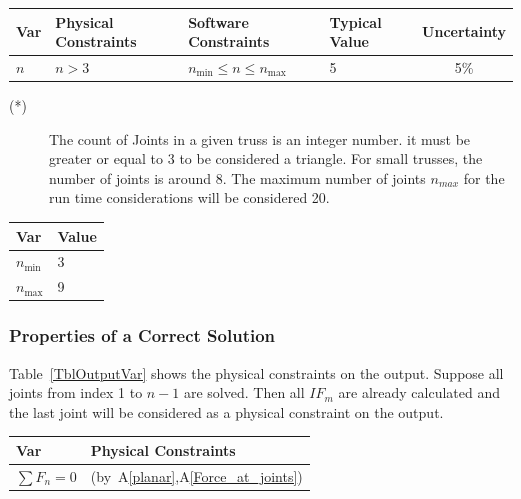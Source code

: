 \documentclass[12pt]{article}
\newcommand{\aref}[1]{A\ref{#1}}
\begin{document}
\begin{table}[!h]
  \caption{Input Variables} \label{TblInputVar}
  \renewcommand{\arraystretch}{1.2}
\noindent \begin{longtable*}{l l l l c} 
  \toprule
  \textbf{Var} & \textbf{Physical Constraints} & \textbf{Software Constraints} &
                             \textbf{Typical Value} & \textbf{Uncertainty}\\
  \midrule 
  $n$ & $n > 3$ & $n_{\text{min}} \leq n \leq n_{\text{max}}$ & 5  & 5\%
  \\
  \bottomrule
\end{longtable*}
\end{table}

\noindent 
\begin{description}

\item[(*)] The count of Joints in a given truss is an integer number. it must be greater or equal to 3 to be considered a triangle. For small trusses, the number of joints is around 8. The maximum number of joints $n_{max}$ for the run time considerations will be considered 20.
\end{description}

\begin{table}[!h]
\caption{Specification Parameter Values} \label{TblSpecParams}
\renewcommand{\arraystretch}{1.2}
\noindent \begin{longtable*}{l l} 
  \toprule
  \textbf{Var} & \textbf{Value} \\
  \midrule 
  $n_\text{min}$ & 3 \\
  $n_\text{max}$ & 9\\
  \bottomrule
\end{longtable*}
\end{table}

\subsubsection{Properties of a Correct Solution} \label{sec_CorrectSolution}

\noindent
Table~\ref{TblOutputVar} shows the physical constraints on the output. Suppose all joints from index 1 to $n-1$ are solved. Then all $IF_{m}$ are already calculated and the last joint will be considered as a physical constraint on the output.

\begin{table}[!h]
\caption{Output Variables} \label{TblOutputVar}
\renewcommand{\arraystretch}{1.2}
\noindent \begin{longtable*}{l l} 
  \toprule
  \textbf{Var} & \textbf{Physical Constraints} \\
  \midrule 
  $\sum F_{n}=0$ &  (by~\aref{planar},\aref{Force_at_joints})
  \\
  \bottomrule
\end{longtable*}
\end{table}
\end{document}
